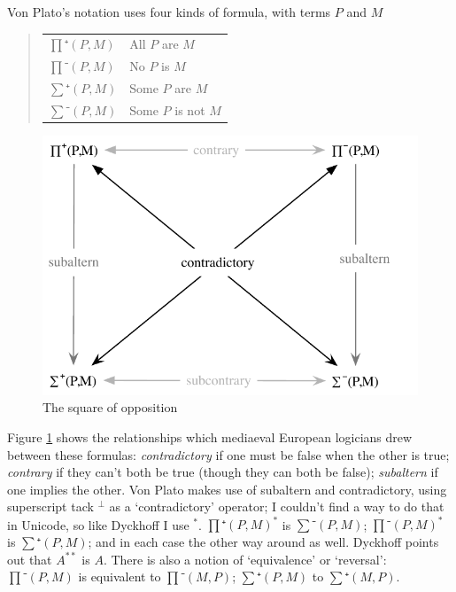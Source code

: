 Von Plato's notation uses four kinds of formula, with terms $P$ and $M$
\begin{quote}
\begin{tabular}{ll}
$∏⁺(P,M)$ & All $P$ are $M$ \\
$∏⁻(P,M)$ & No $P$ is $M$ \\
$∑⁺(P,M)$ & Some $P$ are $M$ \\
$∑⁻(P,M)$ & Some $P$ is not $M$ \\
\end{tabular}
\end{quote}
\begin{figure}[b]
\centering
\includegraphics[scale=0.5]{pics/Aristotle/square_of_opposition}
\caption{The square of opposition}
\label{fig:Aristotle:square_of_opposition}
\end{figure}
Figure \ref{fig:Aristotle:square_of_opposition} shows the relationships which mediaeval European logicians drew between these formulas: \emph{contradictory} if one must be false when the other is true; \emph{contrary} if they can't both be true (though they can both be false); \emph{subaltern} if one implies the other. Von Plato makes use of subaltern and contradictory, using superscript tack $^{⊥}$ as a `contradictory' operator; I couldn't find a way to do that in Unicode, so like Dyckhoff I use $^{*}$. $∏⁺(P,M)^{*}$ is $∑⁻(P,M)$; $∏⁻(P,M)^{*}$ is $∑⁺(P,M)$; and in each case the other way around as well. Dyckhoff points out that $A^{{*}{*}}$ is $A$. There is also a notion of `equivalence' or `reversal': $∏⁻(P,M)$ is equivalent to $∏⁻(M,P)$; $∑⁺(P,M)$ to $∑⁺(M,P)$.

